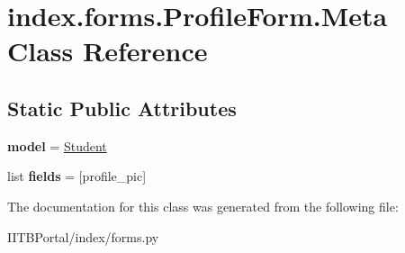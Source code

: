 \hypertarget{classindex_1_1forms_1_1ProfileForm_1_1Meta}{}\section{index.\+forms.\+Profile\+Form.\+Meta Class Reference}
\label{classindex_1_1forms_1_1ProfileForm_1_1Meta}
\subsection*{Static Public Attributes}
\begin{DoxyCompactItemize}
\item 
\mbox{\label{classindex_1_1forms_1_1ProfileForm_1_1Meta_a09f3c40b3da59081c26af6674ccd01f8}} 
{\bfseries model} = \hyperlink{classindex_1_1models_1_1Student}{Student}
\item 
\mbox{\label{classindex_1_1forms_1_1ProfileForm_1_1Meta_abac854a0de899eb63b7f07ca3595bc94}} 
list {\bfseries fields} = \mbox{[}\textquotesingle{}profile\+\_\+pic\textquotesingle{}\mbox{]}
\end{DoxyCompactItemize}


The documentation for this class was generated from the following file\+:\begin{DoxyCompactItemize}
\item 
I\+I\+T\+B\+Portal/index/forms.\+py\end{DoxyCompactItemize}
